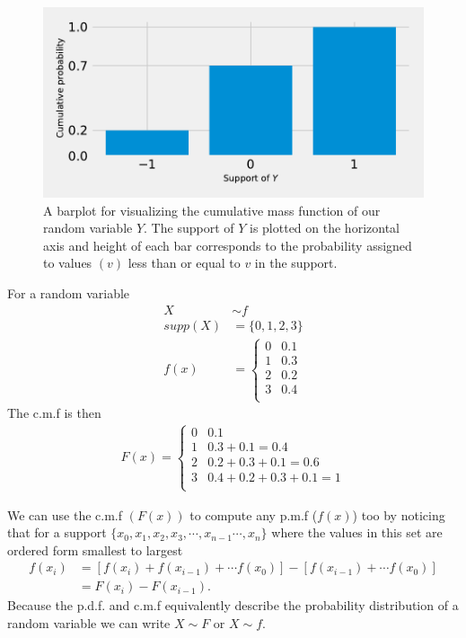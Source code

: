 \begin{figure}[ht!]
    \centering
    \includegraphics{chapters/chapter2/cmfviz.pdf}
    \caption{A barplot for visualizing the cumulative mass function of our random variable $Y$. The support of $Y$ is plotted on the horizontal axis and height of each bar corresponds to the probability assigned to values $(v)$ less than or equal to $v$ in the support.\label{fig.pmfviz}}
\end{figure}


\ex For a random variable 
\begin{align}
    X &\sim f\\
    supp(X) &= \{0,1,2,3\}\\
    f(x) &= \begin{cases}
     0 & 0.1\\
     1 & 0.3\\
     2 & 0.2\\
     3 & 0.4\\
    \end{cases}
\end{align}
The c.m.f is then 
\begin{align}
    F(x) =  
    \begin{cases}
     0 & 0.1\\
     1 & 0.3 + 0.1 = 0.4\\
     2 & 0.2+0.3+0.1 = 0.6\\
     3 & 0.4+0.2+0.3+0.1 = 1\\
     \end{cases}
\end{align}

We can use the c.m.f $(F(x))$ to compute any p.m.f ($f(x)$) too by noticing that for a support $\{x_{0},x_{1},x_{2},x_{3}, \cdots,x_{n-1}\cdots,x_{n}\}$ where the values in this set are ordered form smallest to largest 
\begin{align}
    f(x_{i}) &= \left[f(x_{i}) + f(x_{i-1}) + \cdots f(x_{0}) \right] - \left[f(x_{i-1}) + \cdots f(x_{0})\right] \\ 
    &=F(x_{i}) - F(x_{i-1}).
\end{align}
Because the p.d.f. and c.m.f equivalently describe the probability distribution of a random variable we can write $X\sim F$ or $X \sim f$.  

